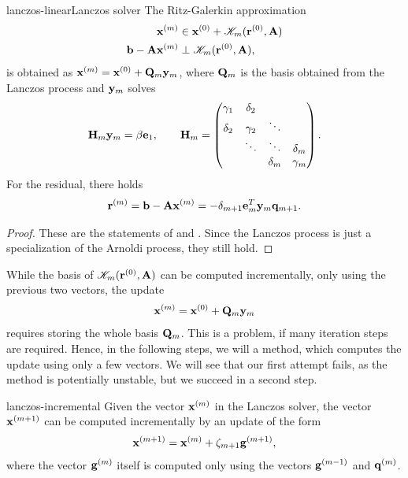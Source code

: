 \begin{Lemma*}{lanczos-linear}{Lanczos solver}
  The Ritz-Galerkin approximation
  \begin{align}
    \mathbf x^{(m)} &\in \mathbf x^{(0)} + \mathscr K_m(\mathbf r^{(0)},\mathbf A)\\
    \mathbf b-\mathbf A \mathbf x^{(m)} &\perp \mathscr K_m(\mathbf r^{(0)},\mathbf A),
  \end{align}
  is obtained as $\mathbf x^{(m)} = \mathbf x^{(0)} + \mathbf Q_m \mathbf y_m$, where $\mathbf Q_m$ is the basis obtained from the Lanczos process and $\mathbf y_m$ solves
  \begin{gather}
    \mathbf H_m\mathbf y_m = \beta\mathbf e_1,
    \qquad \mathbf H_m =
    \begin{pmatrix}
      \gamma_1 & \delta_2\\
      \delta_2 & \gamma_2 & \ddots\\
      &\ddots&\ddots&\delta_m\\
      &&\delta_{m}&\gamma_m
    \end{pmatrix}.
  \end{gather}
  For the residual, there holds
  \begin{gather}
    \mathbf r^{(m)} = \mathbf b-\mathbf A\mathbf x^{(m)} = -\delta_{m+1} \mathbf e_m^T \mathbf y_m \mathbf q_{m+1}.
  \end{gather}
\end{Lemma*}

\begin{proof}
  These are the statements of
   and
  . Since the Lanczos
  process is just a specialization of the Arnoldi process, they still
  hold.
\end{proof}

\begin{intro}
  While the basis of $\mathscr K_m(\mathbf r^{(0)},\mathbf A)$ can be computed
  incrementally, only using the previous two vectors, the update
  \begin{gather}
    \mathbf x^{(m)} = \mathbf x^{(0)} + \mathbf Q_m \mathbf y_m
  \end{gather}
  requires storing the whole basis $\mathbf Q_m$. This is a problem, if
  many iteration steps are required. Hence, in the following steps, we
  will a method, which computes the update using only a few
  vectors. We will see that our first attempt fails, as the method is
  potentially unstable, but we succeed in a second step.
\end{intro}

\begin{Lemma}{lanczos-incremental}
  Given the vector $\mathbf x^{(m)}$ in the Lanczos solver, the vector
  $\mathbf x^{(m+1)}$ can be computed incrementally by an update of the form
  \begin{gather}
    \mathbf x^{(m+1)} = \mathbf x^{(m)} + \zeta_{m+1}\mathbf g^{(m+1)},
  \end{gather}
  where the vector $\mathbf g^{(m)}$ itself is computed only using the
  vectors $\mathbf g^{(m-1)}$ and $\mathbf q^{(m)}$.
\end{Lemma}

